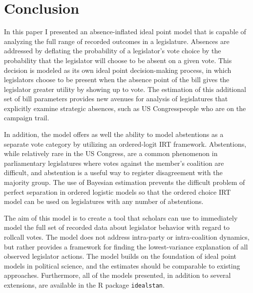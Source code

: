 	\section*{Conclusion}
	
	In this paper I presented an absence-inflated ideal point model that is capable of analyzing the full range of recorded outcomes in a legislature. Absences are addressed by deflating the probability of a legislator's vote choice by the probability that the legislator will choose to be absent on a given vote. This decision is modeled as its own ideal point decision-making process, in which legislators choose to be present when the absence point of the bill gives the legislator greater utility by showing up to vote. The estimation of this additional set of bill parameters provides new avenues for analysis of legislatures that explicitly examine strategic absences, such as US Congresspeople who are on the campaign trail.
	
	In addition, the model offers as well the ability to model abstentions as a separate vote category by utilizing an ordered-logit IRT framework. Abstentions, while relatively rare in the US Congress, are a common phenomenon in parliamentary legislatures where votes against the member's coalition are difficult, and abstention is a useful way to register disagreement with the majority group. The use of Bayesian estimation prevents the difficult problem of perfect separation in ordered logistic models so that the ordered choice IRT model can be used on legislatures with any number of abstentions.
	
	The aim of this model is to create a tool that scholars can use to immediately model the full set of recorded data about legislator behavior with regard to rollcall votes. The model does not address intra-party or intra-coalition dynamics, but rather provides a framework for finding the lowest-variance explanation of all observed legislator actions. The model builds on the foundation of ideal point models in political science, and the estimates should be comparable to existing approaches. Furthermore, all of the models presented, in addition to several extensions, are available in the R package \texttt{idealstan}.
	
	\printbibliography
	
